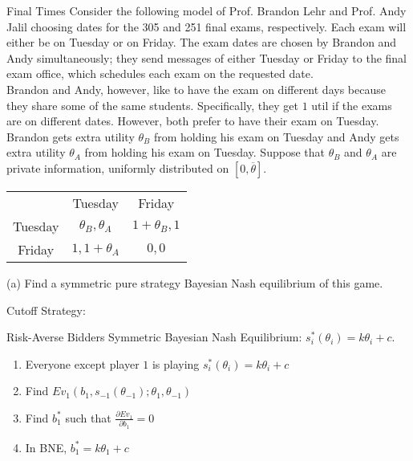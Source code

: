 \documentclass[8pt]{extarticle}
\begin{document}
  \begin{problem}{Final Times}
    Consider the following model of Prof. Brandon Lehr and Prof. Andy Jalil choosing dates for the 305 and 251 final exams, respectively. Each exam will either be on Tuesday or on Friday. The exam dates are chosen by Brandon and Andy simultaneously; they send messages of either Tuesday or Friday to the final exam office, which schedules each exam on the requested date.\\

    Brandon and Andy, however, like to have the exam on different days because they share some of the same students. Specifically, they get $1$ util if the exams are on different dates. However, both prefer to have their exam on Tuesday. Brandon gets extra utility $\theta_B$ from holding his exam on Tuesday and Andy gets extra utility $\theta_A$ from holding his exam on Tuesday. Suppose that $\theta_B$ and $\theta_A$ are private information, uniformly distributed on $[0, \overline{\theta}]$.
    \begin{center}
      \renewcommand{\arraystretch}{1.5}
      \begin{tabular}{c|c|c|}
        \multicolumn{1}{c}{} & \multicolumn{1}{c}{Tuesday} & \multicolumn{1}{c}{Friday}\\
        \cline{2-3}
        Tuesday & $\theta_B,\theta_A$ & $1 + \theta_B,1$\\
        \cline{2-3}
        Friday & $1,1+\theta_A$ & $0,0$\\
        \cline{2-3}
      \end{tabular}
    \end{center}
    \tcblower
    \begin{problem}{(a)}
      Find a symmetric pure strategy Bayesian Nash equilibrium of this game.
      \tcblower
      \begin{description}
        \item[Cutoff Strategy:]
      \end{description}
    \end{problem}
  \end{problem}
  \begin{problem}{Risk-Averse Bidders}
    Symmetric Bayesian Nash Equilibrium: $s_i^{\ast}(\theta_i) = k\theta_i + c$.
    \begin{enumerate}[(1)]
      \item Everyone except player $1$ is playing $s_i^{\ast}(\theta_i) = k\theta_i + c$
      \item Find $Ev_{1}(b_1,s_{-1}(\theta_{-1});\theta_1,\theta_{-1})$
      \item Find $b_1^{\ast}$ such that $\frac{\partial Ev_1}{\partial b_1} = 0$
      \item In BNE, $b_1^{\ast} = k\theta_1 + c$
    \end{enumerate}
  \end{problem}
\end{document}
